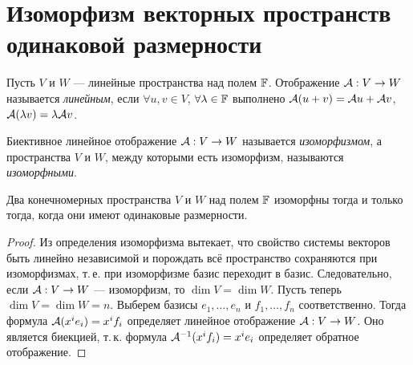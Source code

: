 \section{Изоморфизм векторных пространств одинаковой размерности}

\begin{definition}
    Пусть $V$ и $W$ --- линейные пространства над полем $\mathbb{F}$. Отображение $\mathcal{A}: V \to W$ называется \textit{линейным}, если $\forall u, v \in V$, $\forall \lambda \in \mathbb{F}$ выполнено $\mathcal{A}(u + v) = \mathcal{A} u + \mathcal{A} v$, $\mathcal{A}(\lambda v) = \lambda\mathcal{A} v$.
\end{definition}

\begin{definition}
    Биективное линейное отображение $\mathcal{A}: V \to W$ называется \textit{изоморфизмом}, а пространства $V$ и $W$, между которыми есть изоморфизм, называются \textit{изоморфными}.
\end{definition}

\begin{theorem}
    Два конечномерных пространства $V$ и $W$ над полем $\mathbb{F}$ изоморфны тогда и только тогда, когда они имеют одинаковые размерности.
\end{theorem}

\begin{proof}
    Из определения изоморфизма вытекает, что свойство системы векторов быть линейно независимой и порождать всё пространство сохраняются при изоморфизмах, т.\,е. при изоморфизме базис переходит в базис. Следовательно, если $\mathcal{A}: V \to W$ --- изоморфизм, то $\dim V = \dim W$. Пусть теперь $\dim V = \dim W = n$. Выберем базисы $e_1, \ldots, e_n$ и $f_1, \ldots, f_n$ соответственно. Тогда формула $\mathcal{A}(x^ie_i) = x^if_i$ определяет линейное отображение $\mathcal{A}: V \to W$. Оно является биекцией, т.\,к. формула $\mathcal{A}^{-1}(x^if_i) = x^ie_i$ определяет обратное отображение.
\end{proof}


